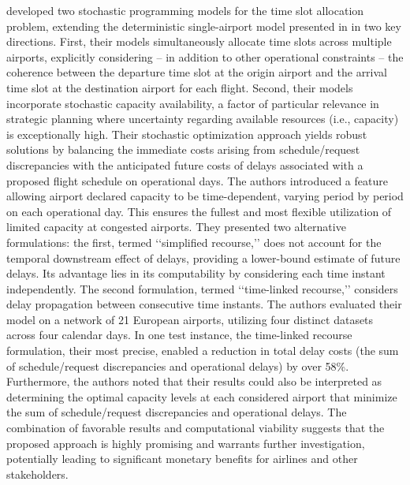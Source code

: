  developed two stochastic programming models for the time slot allocation problem, extending the deterministic single-airport model presented in \cite{zografos2012dealing} in two key directions. First, their models simultaneously allocate time slots across multiple airports, explicitly considering – in addition to other operational constraints – the coherence between the departure time slot at the origin airport and the arrival time slot at the destination airport for each flight. Second, their models incorporate stochastic capacity availability, a factor of particular relevance in strategic planning where uncertainty regarding available resources (i.e., capacity) is exceptionally high. Their stochastic optimization approach yields robust solutions by balancing the immediate costs arising from schedule/request discrepancies with the anticipated future costs of delays associated with a proposed flight schedule on operational days. The authors introduced a feature allowing airport declared capacity to be time-dependent, varying period by period on each operational day. This ensures the fullest and most flexible utilization of limited capacity at congested airports. They presented two alternative formulations: the first, termed ‘‘simplified recourse,’’ does not account for the temporal downstream effect of delays, providing a lower-bound estimate of future delays. Its advantage lies in its computability by considering each time instant independently. The second formulation, termed ‘‘time-linked recourse,’’ considers delay propagation between consecutive time instants. The authors evaluated their model on a network of 21 European airports, utilizing four distinct datasets across four calendar days. In one test instance, the time-linked recourse formulation, their most precise, enabled a reduction in total delay costs (the sum of schedule/request discrepancies and operational delays) by over 58\%. Furthermore, the authors noted that their results could also be interpreted as determining the optimal capacity levels at each considered airport that minimize the sum of schedule/request discrepancies and operational delays. The combination of favorable results and computational viability suggests that the proposed approach is highly promising and warrants further investigation, potentially leading to significant monetary benefits for airlines and other stakeholders.


